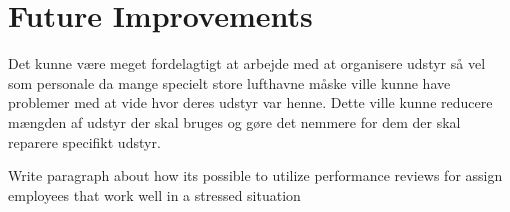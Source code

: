 \section{Future Improvements}

Det kunne være meget fordelagtigt at arbejde med at organisere udstyr så vel som personale da mange specielt store lufthavne måske ville kunne have problemer med at vide hvor deres udstyr var henne. Dette ville kunne reducere mængden af udstyr der skal bruges og gøre det nemmere for dem der skal reparere specifikt udstyr.

Write paragraph about how its possible to utilize performance reviews for assign employees that work well in a stressed situation